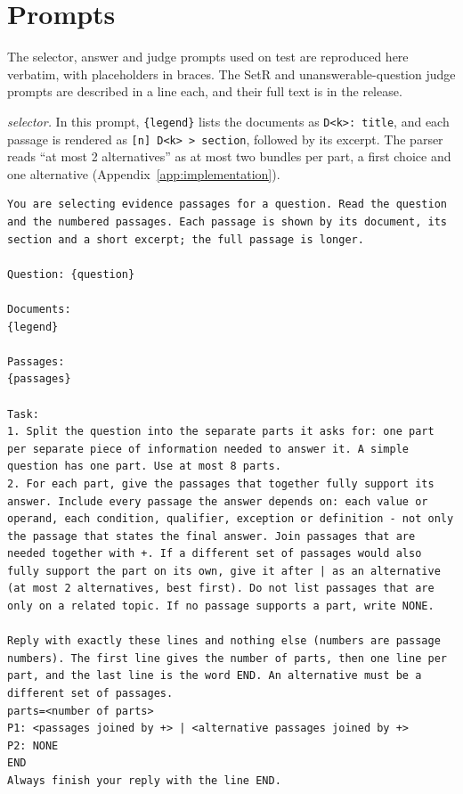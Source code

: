 \section{Prompts}
\label{app:prompts}

The selector, answer and judge prompts used on test are reproduced here verbatim, with placeholders in braces. The SetR and unanswerable-question judge prompts are described in a line each, and their full text is in the release.

\emph{\lexb{} selector.} In this prompt, \texttt{\{legend\}} lists the documents as \texttt{D<k>: title}, and each passage is rendered as \texttt{[n] D<k> > section}, followed by its excerpt. The parser reads ``at most 2 alternatives'' as at most two bundles per part, a first choice and one alternative (Appendix~\ref{app:implementation}).
\begin{lstlisting}
You are selecting evidence passages for a question. Read the question and the numbered passages. Each passage is shown by its document, its section and a short excerpt; the full passage is longer.

Question: {question}

Documents:
{legend}

Passages:
{passages}

Task:
1. Split the question into the separate parts it asks for: one part per separate piece of information needed to answer it. A simple question has one part. Use at most 8 parts.
2. For each part, give the passages that together fully support its answer. Include every passage the answer depends on: each value or operand, each condition, qualifier, exception or definition - not only the passage that states the final answer. Join passages that are needed together with +. If a different set of passages would also fully support the part on its own, give it after | as an alternative (at most 2 alternatives, best first). Do not list passages that are only on a related topic. If no passage supports a part, write NONE.

Reply with exactly these lines and nothing else (numbers are passage numbers). The first line gives the number of parts, then one line per part, and the last line is the word END. An alternative must be a different set of passages.
parts=<number of parts>
P1: <passages joined by +> | <alternative passages joined by +>
P2: NONE
END
Always finish your reply with the line END.
\end{lstlisting}


